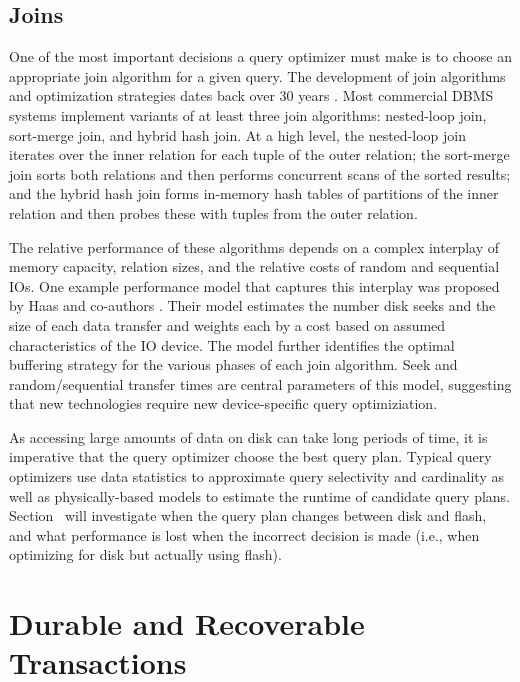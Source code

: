 \subsection{Joins}
\label{sec:Background:Joins}

One of the most important decisions a query optimizer must make is to choose an appropriate join algorithm for a given query.
The development of join algorithms and optimization strategies dates back over 30 years \cite{Selinger1979,Shapiro1986}. 
Most commercial DBMS systems implement variants of at least three join algorithms: nested-loop join, sort-merge join, and hybrid hash join.
At a high level, the nested-loop join iterates over the inner relation for each tuple of the outer relation; the sort-merge join sorts both relations and then performs concurrent scans of the sorted results; and the hybrid hash join forms in-memory hash tables of partitions of the inner relation and then probes these with tuples from the outer relation.

The relative performance of these algorithms depends on a complex interplay of memory capacity, relation sizes, and the relative costs of random and sequential IOs.  
One example performance model that captures this interplay was proposed by Haas and co-authors \cite{DBLP:journals/vldb/HaasCLS97}.
Their model estimates the number disk seeks and the size of each data transfer and weights each by a cost based on assumed characteristics of the IO device.
The model further identifies the optimal buffering strategy for the various phases of each join algorithm.
Seek and random/sequential transfer times are central parameters of this model, suggesting that new technologies require new device-specific query optimiziation.

As accessing large amounts of data on disk can take long periods of time, it is imperative that the query optimizer choose the best query plan.
Typical query optimizers use data statistics to approximate query selectivity and cardinality as well as physically-based models to estimate the runtime of candidate query plans.
Section~ will investigate when the query plan changes between disk and flash, and what performance is lost when the incorrect decision is made (i.e., when optimizing for disk but actually using flash).

\section{Durable and Recoverable Transactions}
\label{sec:Background:Recovery}

